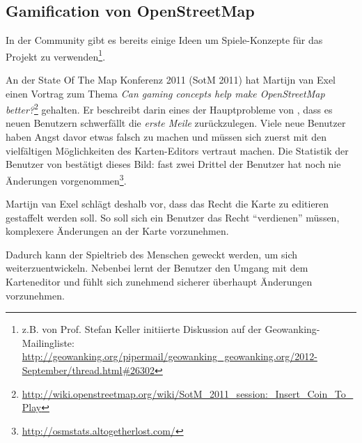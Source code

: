 \subsection{Gamification von OpenStreetMap}
In der  Community gibt es bereits einige Ideen um Spiele-Konzepte für das Projekt zu verwenden\footnote{z.B. von Prof. Stefan Keller initiierte Diskussion auf der Geowanking-Mailingliste: \url{http://geowanking.org/pipermail/geowanking_geowanking.org/2012-September/thread.html\#26302}}.

An der State Of The Map Konferenz 2011 (SotM 2011) hat Martijn van Exel  einen Vortrag zum Thema \emph{Can gaming concepts help make OpenStreetMap better?}\footnote{\url{http://wiki.openstreetmap.org/wiki/SotM_2011_session:_Insert_Coin_To_Play}} gehalten.
Er beschreibt darin eines der Hauptprobleme von , dass es neuen Benutzern schwerfällt die \emph{erste Meile} zurückzulegen.
Viele neue Benutzer haben Angst davor etwas falsch zu machen und müssen sich zuerst mit den vielfältigen Möglichkeiten des Karten-Editors vertraut machen.
Die Statistik der Benutzer von  bestätigt dieses Bild: fast zwei Drittel der Benutzer hat noch nie Änderungen vorgenommen\footnote{\url{http://osmstats.altogetherlost.com/}}.

Martijn van Exel schlägt deshalb vor, dass das Recht die Karte zu editieren gestaffelt werden soll.
So soll sich ein Benutzer das Recht "`verdienen"' müssen, komplexere Änderungen an der Karte vorzunehmen.

Dadurch kann der Spieltrieb des Menschen geweckt werden, um sich weiterzuentwickeln.
Nebenbei lernt der Benutzer den Umgang mit dem Karteneditor und fühlt sich zunehmend sicherer überhaupt Änderungen vorzunehmen.